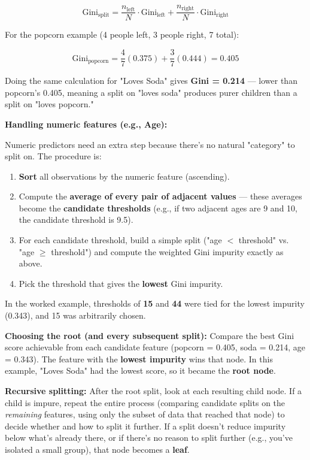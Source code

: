 \documentclass[12pt,openany]{book}
\begin{document}
\[
\text{Gini}_{\text{split}} = \frac{n_{\text{left}}}{N}\cdot \text{Gini}_{\text{left}} + \frac{n_{\text{right}}}{N}\cdot \text{Gini}_{\text{right}}
\]


For the popcorn example (4 people left, 3 people right, 7 total):

\[
\text{Gini}_{\text{popcorn}} = \frac{4}{7}(0.375) + \frac{3}{7}(0.444) = 0.405
\]


Doing the same calculation for "Loves Soda" gives \textbf{Gini = 0.214} --- lower than popcorn's 0.405, meaning a split on "loves soda" produces purer children than a split on "loves popcorn."

\textbf{Handling numeric features (e.g., Age):}

Numeric predictors need an extra step because there's no natural "category" to split on. The procedure is:

\begin{enumerate}[leftmargin=*]
    \item \textbf{Sort} all observations by the numeric feature (ascending).
    \item Compute the \textbf{average of every pair of adjacent values} --- these averages become the \textbf{candidate thresholds} (e.g., if two adjacent ages are 9 and 10, the candidate threshold is 9.5).
    \item For each candidate threshold, build a simple split ("age \(<\) threshold" vs. "age \(\geq\) threshold") and compute the weighted Gini impurity exactly as above.
    \item Pick the threshold that gives the \textbf{lowest} Gini impurity.

\end{enumerate}

In the worked example, thresholds of \textbf{15} and \textbf{44} were tied for the lowest impurity (0.343), and 15 was arbitrarily chosen.

\textbf{Choosing the root (and every subsequent split):}
Compare the best Gini score achievable from each candidate feature (popcorn = 0.405, soda = 0.214, age = 0.343). The feature with the \textbf{lowest impurity} wins that node. In this example, "Loves Soda" had the lowest score, so it became the \textbf{root node}.

\textbf{Recursive splitting:} After the root split, look at each resulting child node. If a child is impure, repeat the entire process (comparing candidate splits on the \textit{remaining} features, using only the subset of data that reached that node) to decide whether and how to split it further. If a split doesn't reduce impurity below what's already there, or if there's no reason to split further (e.g., you've isolated a small group), that node becomes a \textbf{leaf}.
\end{document}

